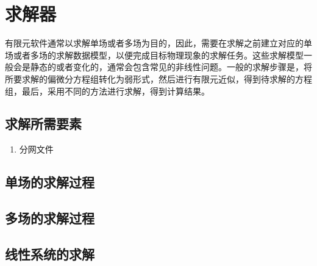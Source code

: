 \chapter{求解器}
有限元软件通常以求解单场或者多场为目的，因此，需要在求解之前建立对应的单场或者多场的求解数据模型，以便完成目标物理现象的求解任务。这些求解模型一般会是静态的或者变化的，通常会包含常见的非线性问题。一般的求解步骤是，将所要求解的偏微分方程组转化为弱形式，然后进行有限元近似，得到待求解的方程组，最后，采用不同的方法进行求解，得到计算结果。
\section{求解所需要素}
\begin{enumerate}
    \item 分网文件
\end{enumerate}
\section{单场的求解过程}

\section{多场的求解过程}

\section{线性系统的求解}



